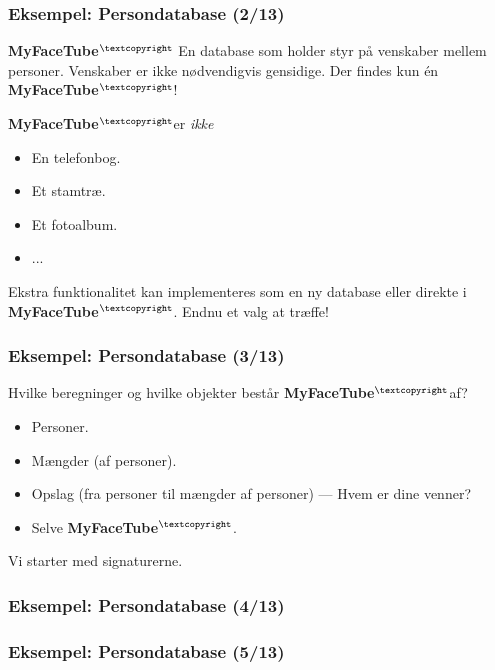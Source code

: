 \documentclass[slidestop,compress,mathserif, xcolor=table]{beamer}
\newcommand{\mft}{\textbf{MyFaceTube$^{\scriptsize{\textcopyright}}$}}
\begin{document}
\begin{frame}
  \frametitle{Eksempel: Persondatabase \quad (2/13)}

  \begin{block}{\mft}
    En database som holder styr på venskaber mellem personer. Venskaber er ikke
    nødvendigvis gensidige.
    \center Der findes kun én \mft!
  \end{block}

  \mft er \textit{ikke}
  \begin{itemize}
  \item En telefonbog.
  \item Et stamtræ.
  \item Et fotoalbum.
  \item ...
  \end{itemize}

  Ekstra funktionalitet kan implementeres som en ny database eller direkte i
  \mft. Endnu et valg at træffe!
\end{frame}

\begin{frame}
  \frametitle{Eksempel: Persondatabase \quad (3/13)}

  Hvilke beregninger og hvilke objekter består \mft af?

  \begin{itemize}
  \item Personer.
  \item Mængder (af personer).
  \item Opslag (fra personer til mængder af personer) --- Hvem er dine venner?
  \item Selve \mft.
  \end{itemize}

  Vi starter med signaturerne.
\end{frame}

\begin{frame}[fragile]
  \frametitle{Eksempel: Persondatabase \quad (4/13)}
  \begin{block}{}
    
  \end{block}
\end{frame}

\begin{frame}[fragile]
  \frametitle{Eksempel: Persondatabase \quad (5/13)}
  \begin{block}{}
    
  \end{block}
\end{frame}
\end{document}
